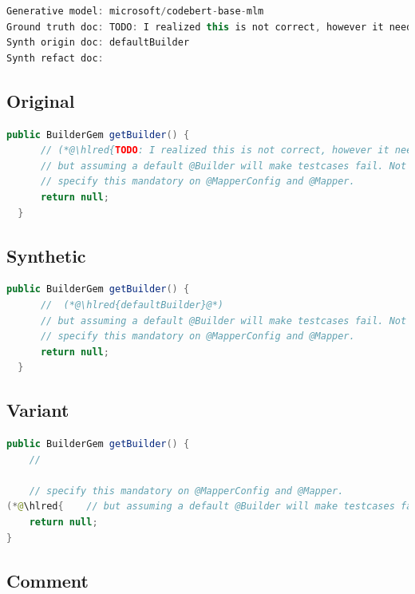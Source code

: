 \documentclass[usenames,dvipsnames]{article} %
\DeclareRobustCommand{\hlred}[1]{{\sethlcolor{pink}\hl{#1}}}
\begin{document}
  \begin{lstlisting}[language=java]
Generative model: microsoft/codebert-base-mlm
Ground truth doc: TODO: I realized this is not correct, however it needs to be null in order to keep downward compatibility
Synth origin doc: defaultBuilder
Synth refact doc:
  \end{lstlisting}

  \subsection{Original}
  \begin{lstlisting}[language=java]
  public BuilderGem getBuilder() {
      // (*@\hlred{TODO: I realized this is not correct, however it needs to be null in order to keep downward compatibility}@*)
      // but assuming a default @Builder will make testcases fail. Not having a default means that you need to
      // specify this mandatory on @MapperConfig and @Mapper.
      return null;
  }
  \end{lstlisting}
  \subsection{Synthetic}

  \begin{lstlisting}[language=java]
  public BuilderGem getBuilder() {
      //  (*@\hlred{defaultBuilder}@*)
      // but assuming a default @Builder will make testcases fail. Not having a default means that you need to
      // specify this mandatory on @MapperConfig and @Mapper.
      return null;
  }
  \end{lstlisting}

  \subsection{Variant}

  \begin{lstlisting}[language=java]
public BuilderGem getBuilder() {
    //

    // specify this mandatory on @MapperConfig and @Mapper.
(*@\hlred{    // but assuming a default @Builder will make testcases fail. Not having a default means that you need to}@*)
    return null;
}
  \end{lstlisting}

  \subsection{Comment}
\end{document}
